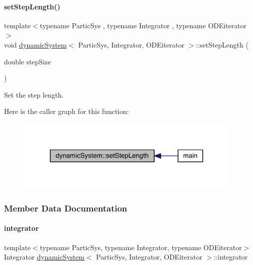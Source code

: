\paragraph{\texorpdfstring{set\+Step\+Length()}{setStepLength()}}
{\footnotesize\ttfamily template$<$typename Partic\+Sys , typename Integrator , typename O\+D\+Eiterator $>$ \\
void \mbox{\hyperlink{classdynamic_system}{dynamic\+System}}$<$ Partic\+Sys, Integrator, O\+D\+Eiterator $>$\+::set\+Step\+Length (\begin{DoxyParamCaption}\item[{double}]{step\+Size }\end{DoxyParamCaption})}



Set the step length. 

Here is the caller graph for this function\+:\nopagebreak
\begin{figure}[H]
\begin{center}
\leavevmode
\includegraphics[width=310pt]{classdynamic_system_af1b1ccfa965c677bd66029b42377117d_icgraph}
\end{center}
\end{figure}


\subsubsection{Member Data Documentation}
\mbox{\label{classdynamic_system_adf34beb841273d743821fd2df47e0aab}} 
\paragraph{\texorpdfstring{integrator}{integrator}}
{\footnotesize\ttfamily template$<$typename Partic\+Sys, typename Integrator, typename O\+D\+Eiterator$>$ \\
Integrator \mbox{\hyperlink{classdynamic_system}{dynamic\+System}}$<$ Partic\+Sys, Integrator, O\+D\+Eiterator $>$\+::integrator}



